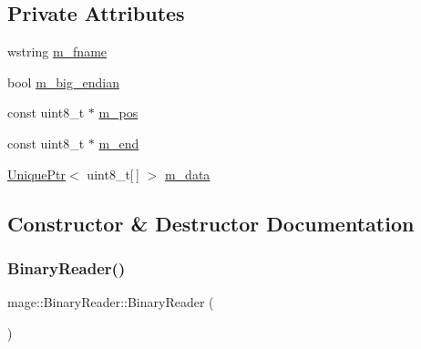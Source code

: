 \subsection*{Private Attributes}
\begin{DoxyCompactItemize}
\item 
wstring \hyperlink{classmage_1_1_binary_reader_a9c97c02d53ce60a9952751ad4f55414f}{m\+\_\+fname}
\item 
bool \hyperlink{classmage_1_1_binary_reader_a8d23fde958e08efe248edb5d92861113}{m\+\_\+big\+\_\+endian}
\item 
const uint8\+\_\+t $\ast$ \hyperlink{classmage_1_1_binary_reader_a086c8b8615dddb15a97acf657bb4d73b}{m\+\_\+pos}
\item 
const uint8\+\_\+t $\ast$ \hyperlink{classmage_1_1_binary_reader_a929b6480629014c24263ec3042b1f364}{m\+\_\+end}
\item 
\hyperlink{namespacemage_a8c307fbcc33bce9b7f2aa4c26c3b95cf}{Unique\+Ptr}$<$ uint8\+\_\+t\mbox{[}$\,$\mbox{]} $>$ \hyperlink{classmage_1_1_binary_reader_a34820a214a5b98e09beb12e8a465b0e3}{m\+\_\+data}
\end{DoxyCompactItemize}


\subsection{Constructor \& Destructor Documentation}
\hypertarget{classmage_1_1_binary_reader_aab82579cef4f2f022273cf1adfcc8497}{}\label{classmage_1_1_binary_reader_aab82579cef4f2f022273cf1adfcc8497} 
\subsubsection{\texorpdfstring{Binary\+Reader()}{BinaryReader()}\hspace{0.1cm}{\footnotesize\ttfamily [1/2]}}
{\footnotesize\ttfamily mage\+::\+Binary\+Reader\+::\+Binary\+Reader (\begin{DoxyParamCaption}{ }\end{DoxyParamCaption})}

\hypertarget{classmage_1_1_binary_reader_aa300382cfa1585bb2f76c4e764bb5617}{}\label{classmage_1_1_binary_reader_aa300382cfa1585bb2f76c4e764bb5617} 

